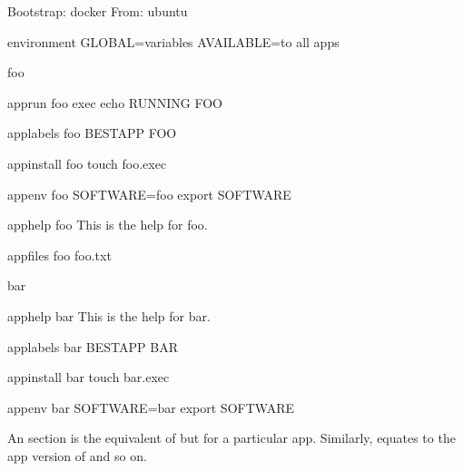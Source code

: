 \documentclass[letterpaper,10pt,english]{sphinxmanual}
\begin{document}
%
\begin{sphinxVerbatim}[commandchars=\\\{\}]
Bootstrap: docker
From: ubuntu

\PYGZpc{}environment
    GLOBAL=variables
    AVAILABLE=\PYGZdq{}to all apps\PYGZdq{}

\PYGZsh{}\PYGZsh{}\PYGZsh{}\PYGZsh{}\PYGZsh{}\PYGZsh{}\PYGZsh{}\PYGZsh{}\PYGZsh{}\PYGZsh{}\PYGZsh{}\PYGZsh{}\PYGZsh{}\PYGZsh{}\PYGZsh{}\PYGZsh{}\PYGZsh{}\PYGZsh{}\PYGZsh{}\PYGZsh{}\PYGZsh{}\PYGZsh{}\PYGZsh{}\PYGZsh{}\PYGZsh{}\PYGZsh{}\PYGZsh{}\PYGZsh{}\PYGZsh{}\PYGZsh{}
\PYGZsh{} foo
\PYGZsh{}\PYGZsh{}\PYGZsh{}\PYGZsh{}\PYGZsh{}\PYGZsh{}\PYGZsh{}\PYGZsh{}\PYGZsh{}\PYGZsh{}\PYGZsh{}\PYGZsh{}\PYGZsh{}\PYGZsh{}\PYGZsh{}\PYGZsh{}\PYGZsh{}\PYGZsh{}\PYGZsh{}\PYGZsh{}\PYGZsh{}\PYGZsh{}\PYGZsh{}\PYGZsh{}\PYGZsh{}\PYGZsh{}\PYGZsh{}\PYGZsh{}\PYGZsh{}\PYGZsh{}

\PYGZpc{}apprun foo
    exec echo \PYGZdq{}RUNNING FOO\PYGZdq{}

\PYGZpc{}applabels foo
   BESTAPP FOO

\PYGZpc{}appinstall foo
   touch foo.exec

\PYGZpc{}appenv foo
    SOFTWARE=foo
    export SOFTWARE

\PYGZpc{}apphelp foo
    This is the help for foo.

\PYGZpc{}appfiles foo
   foo.txt

\PYGZsh{}\PYGZsh{}\PYGZsh{}\PYGZsh{}\PYGZsh{}\PYGZsh{}\PYGZsh{}\PYGZsh{}\PYGZsh{}\PYGZsh{}\PYGZsh{}\PYGZsh{}\PYGZsh{}\PYGZsh{}\PYGZsh{}\PYGZsh{}\PYGZsh{}\PYGZsh{}\PYGZsh{}\PYGZsh{}\PYGZsh{}\PYGZsh{}\PYGZsh{}\PYGZsh{}\PYGZsh{}\PYGZsh{}\PYGZsh{}\PYGZsh{}\PYGZsh{}\PYGZsh{}
\PYGZsh{} bar
\PYGZsh{}\PYGZsh{}\PYGZsh{}\PYGZsh{}\PYGZsh{}\PYGZsh{}\PYGZsh{}\PYGZsh{}\PYGZsh{}\PYGZsh{}\PYGZsh{}\PYGZsh{}\PYGZsh{}\PYGZsh{}\PYGZsh{}\PYGZsh{}\PYGZsh{}\PYGZsh{}\PYGZsh{}\PYGZsh{}\PYGZsh{}\PYGZsh{}\PYGZsh{}\PYGZsh{}\PYGZsh{}\PYGZsh{}\PYGZsh{}\PYGZsh{}\PYGZsh{}\PYGZsh{}

\PYGZpc{}apphelp bar
    This is the help for bar.

\PYGZpc{}applabels bar
   BESTAPP BAR

\PYGZpc{}appinstall bar
    touch bar.exec

\PYGZpc{}appenv bar
    SOFTWARE=bar
    export SOFTWARE
\end{sphinxVerbatim}

An  section is the equivalent of  but for a particular
app. Similarly,  equates to the app version of  and
so on.
\end{document}
